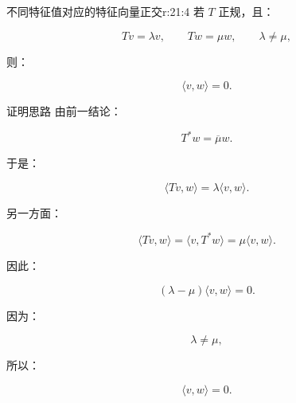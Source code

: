 \begin{jprop}{不同特征值对应的特征向量正交}{r:21:4}
若 $T$ 正规，且：

\[
Tv=\lambda v,
\qquad
Tw=\mu w,
\qquad
\lambda\ne\mu,
\]

则：

\[
\langle v,w\rangle=0.
\]
\end{jprop}

\begin{jproof}{证明思路}
由前一结论：

\[
T^*w=\overline{\mu}w.
\]

于是：

\[
\langle Tv,w\rangle
=
\lambda\langle v,w\rangle.
\]

另一方面：

\[
\langle Tv,w\rangle
=
\langle v,T^*w\rangle
=
\mu\langle v,w\rangle.
\]

因此：

\[
(\lambda-\mu)\langle v,w\rangle=0.
\]

因为：

\[
\lambda\ne\mu,
\]

所以：

\[
\langle v,w\rangle=0.
\]
\end{jproof}
